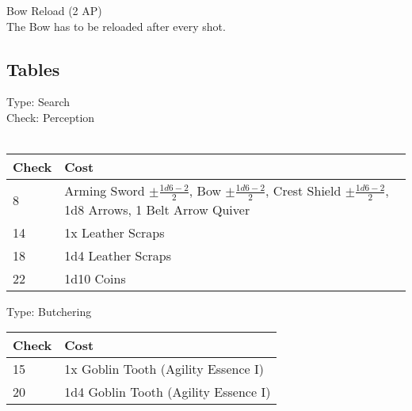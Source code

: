 Bow Reload (2 AP)\\
The Bow has to be reloaded after every shot.

\subsection{Tables}
Type: Search\\
Check: Perception\\
\\
\begin{minipage}{0.8\textwidth}
	\begin{tabular}{|l | p{11cm}|}
		\hline
		Check & Cost\\
		\hline
		8 & Arming Sword $\pm \frac{1d6 - 2}{2}$, Bow $\pm \frac{1d6 - 2}{2}$, Crest Shield $\pm \frac{1d6 - 2}{2}$, 1d8 Arrows, 1 Belt Arrow Quiver\\
		14 & 1x Leather Scraps\\
		18 & 1d4 Leather Scraps\\
		22 & 1d10 Coins\\
		\hline
	\end{tabular}
\end{minipage}

Type: Butchering
\\
\begin{minipage}{0.8\textwidth}
	\begin{tabular}{|l | l|}
		\hline
		Check & Cost\\
		\hline
		15 & 1x Goblin Tooth (Agility Essence I)\\
		20 & 1d4 Goblin Tooth (Agility Essence I)\\
		\hline
	\end{tabular}
\end{minipage}
\pagebreak